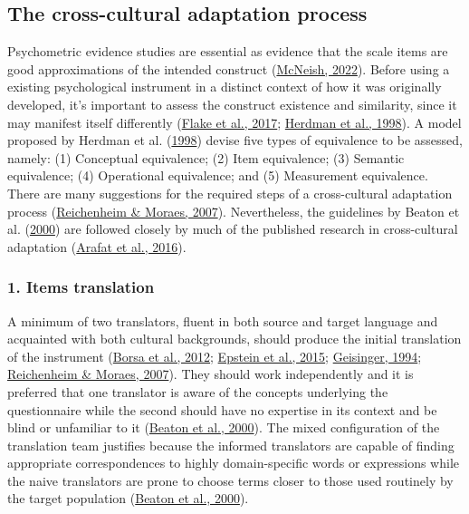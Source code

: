 \documentclass[
  ,doc,11pt, twoside,floatsintext]{apa6}
\begin{document}
\hypertarget{the-cross-cultural-adaptation-process}{%
\subsection{The cross-cultural adaptation process}\label{the-cross-cultural-adaptation-process}}

Psychometric evidence studies are essential as evidence that the scale items are good approximations of the intended construct (\protect\hyperlink{ref-mcneish2022a}{McNeish, 2022}). Before using a existing psychological instrument in a distinct context of how it was originally developed, it's important to assess the construct existence and similarity, since it may manifest itself differently (\protect\hyperlink{ref-flakeConstructValidationSocial2017}{Flake et al., 2017}; \protect\hyperlink{ref-herdmanModelEquivalenceCultural1998}{Herdman et al., 1998}). A model proposed by Herdman et al. (\protect\hyperlink{ref-herdmanModelEquivalenceCultural1998}{1998}) devise five types of equivalence to be assessed, namely: (1) Conceptual equivalence; (2) Item equivalence; (3) Semantic equivalence; (4) Operational equivalence; and (5) Measurement equivalence. There are many suggestions for the required steps of a cross-cultural adaptation process (\protect\hyperlink{ref-reichenheim2007}{Reichenheim \& Moraes, 2007}). Nevertheless, the guidelines by Beaton et al. (\protect\hyperlink{ref-beaton2000}{2000}) are followed closely by much of the published research in cross-cultural adaptation (\protect\hyperlink{ref-arafat2016}{Arafat et al., 2016}).

\hypertarget{items-translation}{%
\subsubsection{1. Items translation}\label{items-translation}}

A minimum of two translators, fluent in both source and target language and acquainted with both cultural backgrounds, should produce the initial translation of the instrument (\protect\hyperlink{ref-borsaAdaptacaoValidacaoInstrumentos2012}{Borsa et al., 2012}; \protect\hyperlink{ref-epstein2015}{Epstein et al., 2015}; \protect\hyperlink{ref-geisinger1994}{Geisinger, 1994}; \protect\hyperlink{ref-reichenheim2007}{Reichenheim \& Moraes, 2007}). They should work independently and it is preferred that one translator is aware of the concepts underlying the questionnaire while the second should have no expertise in its context and be blind or unfamiliar to it (\protect\hyperlink{ref-beaton2000}{Beaton et al., 2000}). The mixed configuration of the translation team justifies because the informed translators are capable of finding appropriate correspondences to highly domain-specific words or expressions while the naive translators are prone to choose terms closer to those used routinely by the target population (\protect\hyperlink{ref-beaton2000}{Beaton et al., 2000}).
\end{document}
